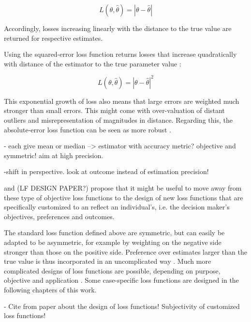         \begin{equation}\label{eq:AbsLossFunction}
        L(\theta,\hat{\theta}) = |\theta - \hat{\theta}|
        \end{equation}        
        
        Accordingly, losses increasing linearly with the distance to the true value are returned for respective estimates.
        
        Using the squared-error loss function returns losses that increase quadratically with distance of the estimator to the true parameter value \citep{davidson2015}:
        
        \begin{equation}\label{eq:SqrLossFunction}
        L(\theta,\hat{\theta}) = |\theta - \hat{\theta}|^2
        \end{equation}        
        
        This exponential growth of loss also means that large errors are weighted much stronger than small errors. This might come with over-valuation of distant outliers and misrepresentation of magnitudes in distance. Regarding this, the absolute-error loss function can be seen as more robust \citep{davidson2015}.
        
        - each give mean or median --> estimator with accuracy metric? objective and symmetric! aim at high precision. 
        
        -shift in perspective. look at outcome instead of estimation precision!     
           
        \citet{davidson2015} and (LF DESIGN PAPER?) propose that it might be useful to move away from these type of objective loss functions to the design of new loss functions that are specifically customized to an reflect an individual's, i.e. the decision maker's objectives, preferences and outcomes. 
        
        The standard loss function defined above are symmetric, but can easily be adapted to be asymmetric, for example by weighting on the negative side stronger than those on the positive side. Preference over estimates larger than the true value is thus incorporated in an uncomplicated way \citep{davidson2015}. Much more complicated designs of loss functions are possible, depending on purpose, objective and application \citep{davidson2015}. Some case-specific loss functions are designed in the following chapters of this work.
        
        - Cite from paper about the design of loss functions! Subjectivity of customized loss functions!
        
